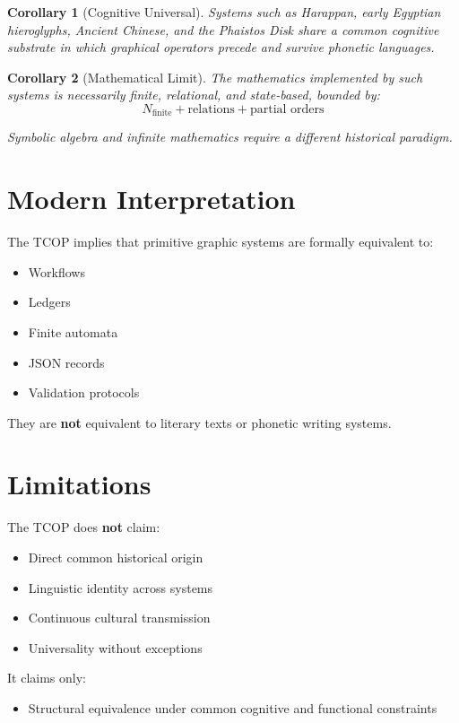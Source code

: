 \documentclass[12pt,a4paper]{article}
\newtheorem{corollary}{Corollary}[theorem]
\begin{document}
\begin{corollary}[Cognitive Universal]
Systems such as Harappan, early Egyptian hieroglyphs, Ancient Chinese, and the Phaistos Disk share a common cognitive substrate in which graphical operators precede and survive phonetic languages.
\end{corollary}

\begin{corollary}[Mathematical Limit]
The mathematics implemented by such systems is necessarily finite, relational, and state-based, bounded by:
\[
N_{\text{finite}} + \text{relations} + \text{partial orders}
\]

Symbolic algebra and infinite mathematics require a different historical paradigm.
\end{corollary}

\section{Modern Interpretation}

The TCOP implies that primitive graphic systems are formally equivalent to:
\begin{itemize}
    \item Workflows
    \item Ledgers
    \item Finite automata
    \item JSON records
    \item Validation protocols
\end{itemize}

They are \textbf{not} equivalent to literary texts or phonetic writing systems.

\section{Limitations}

The TCOP does \textbf{not} claim:
\begin{itemize}
    \item Direct common historical origin
    \item Linguistic identity across systems
    \item Continuous cultural transmission
    \item Universality without exceptions
\end{itemize}

It claims only:
\begin{itemize}
    \item Structural equivalence under common cognitive and functional constraints
\end{itemize}
\end{document}
